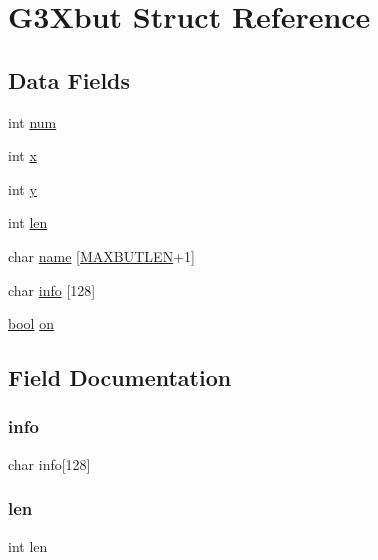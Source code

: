 \hypertarget{struct_g3_xbut}{}\section{G3\+Xbut Struct Reference}
\label{struct_g3_xbut}
\subsection*{Data Fields}
\begin{DoxyCompactItemize}
\item 
int \hyperlink{struct_g3_xbut_a86cf672daa4e0ad11ad10efc894d19c8}{num}
\item 
int \hyperlink{struct_g3_xbut_a6150e0515f7202e2fb518f7206ed97dc}{x}
\item 
int \hyperlink{struct_g3_xbut_a0a2f84ed7838f07779ae24c5a9086d33}{y}
\item 
int \hyperlink{struct_g3_xbut_afed088663f8704004425cdae2120b9b3}{len}
\item 
char \hyperlink{struct_g3_xbut_aa998d085055b9e9634ea1781cc0163c7}{name} \mbox{[}\hyperlink{g3x__switch_8c_a0e40ba0c0da54aafd8c34999455ec4fa}{M\+A\+X\+B\+U\+T\+L\+EN}+1\mbox{]}
\item 
char \hyperlink{struct_g3_xbut_aef383a8ccd6a48889b57cb6ceb7091f6}{info} \mbox{[}128\mbox{]}
\item 
\hyperlink{g3x__types_8h_af6a258d8f3ee5206d682d799316314b1}{bool} \hyperlink{struct_g3_xbut_aaa928c9a62449f7946da1e32f66c70d2}{on}
\end{DoxyCompactItemize}


\subsection{Field Documentation}
\mbox{\label{struct_g3_xbut_aef383a8ccd6a48889b57cb6ceb7091f6}} 
\subsubsection{\texorpdfstring{info}{info}}
{\footnotesize\ttfamily char info\mbox{[}128\mbox{]}}

\mbox{\label{struct_g3_xbut_afed088663f8704004425cdae2120b9b3}} 
\subsubsection{\texorpdfstring{len}{len}}
{\footnotesize\ttfamily int len}


